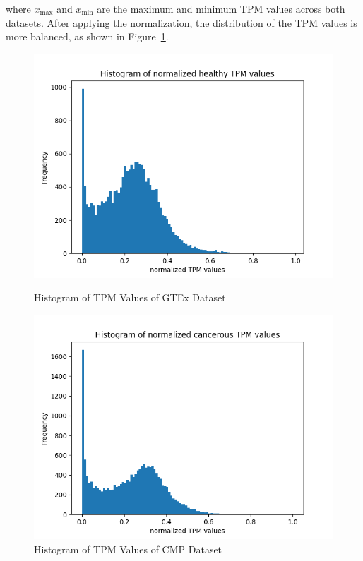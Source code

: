 where $x_{\max}$ and $x_{\min}$ are the maximum and minimum TPM values across both datasets.
After applying the normalization, the distribution of the TPM values is more balanced, as shown in Figure~\ref{fig:03_02_normalized_tpm_both}.

\begin{figure}[h]
    \includegraphics[width=\linewidth]{figures/03_02_normalized_gtex_tpm}
    \caption{Histogram of TPM Values of GTEx Dataset}
\endminipage
\hfill
{}
  \includegraphics[width=\linewidth]{figures/03_02_normalized_cmp_tpm}
  \caption{Histogram of TPM Values of CMP Dataset}
\endminipage
\label{fig:03_02_normalized_tpm_both}
\end{figure}


